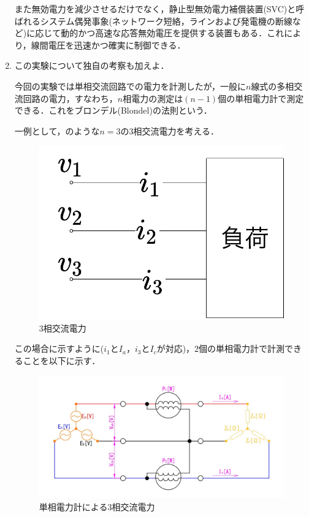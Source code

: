 \begin{enumerate}[1.)]
	また無効電力を減少させるだけでなく，静止型無効電力補償装置(SVC)と呼ばれるシステム偶発事象(ネットワーク短絡，ラインおよび発電機の断線など)に応じて動的かつ高速な応答無効電圧を提供する装置もある．これにより，線間電圧を迅速かつ確実に制御できる\cite{padsfuvg}．
	
	\item この実験について独自の考察も加えよ\cite{1130000798278276}．
	
	今回の実験では単相交流回路での電力を計測したが，一般に$n$線式の多相交流回路の電力，すなわち，$n$相電力の測定は$(n-1)$個の単相電力計で測定できる．これをブロンデル(Blondel)の法則という．
	
	一例として，のような$n=3$の3相交流電力を考える．
	\begin{figure}[h]
	\centering
	\includegraphics[scale=0.5]{./fig/three.pdf}
	\caption{3相交流電力}
	\label{fig:three}
	\end{figure}
	
	この場合に示すように($i_{1}$と$I_{a}$，$i_{3}$と$I_{c}$が対応)，2個の単相電力計で計測できることを以下に示す．

	\begin{figure}[h]
	\centering
	\includegraphics[scale=0.5]{./fig/threeby2.png}
	\caption{単相電力計による3相交流電力\cite{ffvds}}
	\label{fig:threeby2}
	\end{figure}
		

\end{enumerate}
